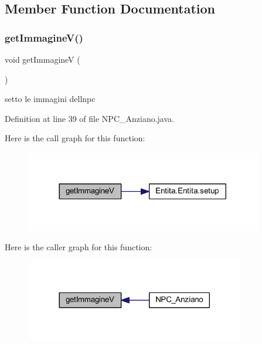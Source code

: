 \subsection{Member Function Documentation}
\mbox{\label{class_entita_1_1_n_p_c___anziano_a3dc41fc873c15856e3f445fdb128aba0}} 
\subsubsection{\texorpdfstring{get\+Immagine\+V()}{getImmagineV()}}
{\footnotesize\ttfamily void get\+ImmagineV (\begin{DoxyParamCaption}{ }\end{DoxyParamCaption})}



setto le immagini dell\textquotesingle{}npc 



Definition at line 39 of file N\+P\+C\+\_\+\+Anziano.\+java.

Here is the call graph for this function\+:
\nopagebreak
\begin{figure}[H]
\begin{center}
\leavevmode
\includegraphics[width=293pt]{class_entita_1_1_n_p_c___anziano_a3dc41fc873c15856e3f445fdb128aba0_cgraph}
\end{center}
\end{figure}
Here is the caller graph for this function\+:
\nopagebreak
\begin{figure}[H]
\begin{center}
\leavevmode
\includegraphics[width=272pt]{class_entita_1_1_n_p_c___anziano_a3dc41fc873c15856e3f445fdb128aba0_icgraph}
\end{center}
\end{figure}
\mbox{\label{class_entita_1_1_n_p_c___anziano_a8310c90e226ac9bc11547a3adb9cd0f3}} 
